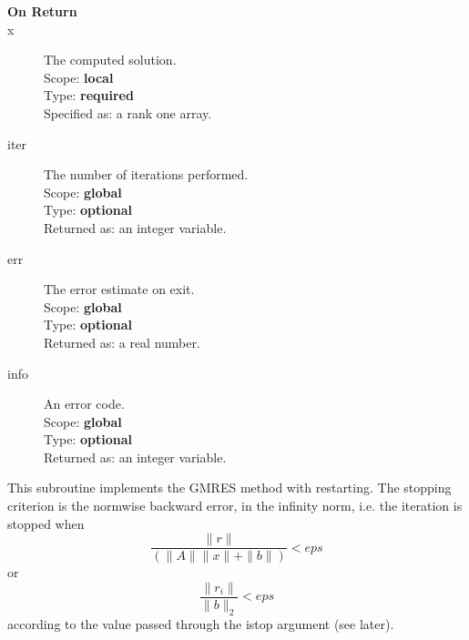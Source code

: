 \begin{description}
\item[\bf On Return] 
\item[x] The computed solution. \\
Scope: {\bf local} \\
Type: {\bf required}\\
Specified as: a rank one array.
\item[iter]  The number of iterations performed.\\
Scope: {\bf global} \\
Type: {\bf optional}\\
Returned  as: an integer variable.
\item[err]  The error estimate on exit.\\
Scope: {\bf global} \\
Type: {\bf optional}\\
Returned  as: a real number.
\item[info]  An error code.\\
Scope: {\bf global} \\
Type: {\bf optional}\\
Returned  as: an integer variable.
\end{description}


%
%

This subroutine implements the GMRES method with restarting. The
stopping criterion is the normwise backward error, in the infinity
norm, i.e. the iteration is stopped when 
\[ \frac{\|r\|}{(\|A\|\|x\|+\|b\|)} < eps \]
or
\[ \frac{\|r_i\|}{\|b\|_2} < eps \]
according to the value passed through the  istop argument (see later).




